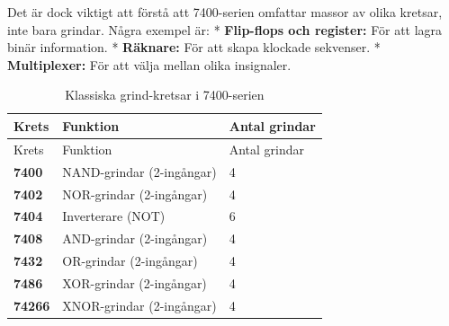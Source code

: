 \documentclass[
  swedish,
  letterpaper,
  oneside,
  openany]{book}
\begin{document}
Det är dock viktigt att förstå att 7400-serien omfattar massor av olika
kretsar, inte bara grindar. Några exempel är: * \textbf{Flip-flops och
register:} För att lagra binär information. * \textbf{Räknare:} För att
skapa klockade sekvenser. * \textbf{Multiplexer:} För att välja mellan
olika insignaler.

\begin{longtable}[]{@{}lll@{}}
\caption{Klassiska grind-kretsar i
7400-serien}\label{tbl-7400-gates}\tabularnewline
\toprule\noalign{}
Krets & Funktion & Antal grindar \\
\midrule\noalign{}
\endfirsthead
\toprule\noalign{}
Krets & Funktion & Antal grindar \\
\midrule\noalign{}
\endhead
\bottomrule\noalign{}
\endlastfoot
\textbf{7400} & NAND-grindar (2-ingångar) & 4 \\
\textbf{7402} & NOR-grindar (2-ingångar) & 4 \\
\textbf{7404} & Inverterare (NOT) & 6 \\
\textbf{7408} & AND-grindar (2-ingångar) & 4 \\
\textbf{7432} & OR-grindar (2-ingångar) & 4 \\
\textbf{7486} & XOR-grindar (2-ingångar) & 4 \\
\textbf{74266} & XNOR-grindar (2-ingångar) & 4 \\
\end{longtable}
\end{document}
